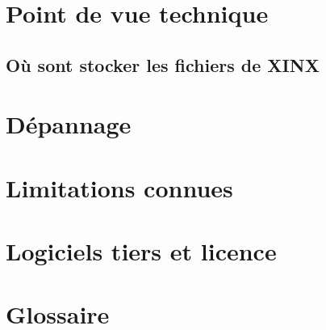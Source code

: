 \documentclass[a4paper,10pt,twoside]{book}
\begin{document}
\chapter{Point de vue technique}

\section{Où sont stocker les fichiers de XINX}

\chapter{Dépannage}

\chapter{Limitations connues}

\chapter{Logiciels tiers et licence}

\chapter{Glossaire}
\end{document}
